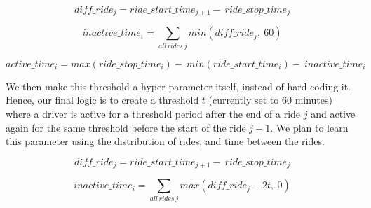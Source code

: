 \documentclass[11pt]{article}
\begin{document}




\begin{equation*}
    \mathit{diff}\_ride_j = ride\_start\_time_{j+1} -\ ride\_stop\_time_j
\end{equation*}

\begin{equation*}
    inactive\_time_i = \sum_{all\, rides\, j} min(\mathit{diff}\_ride_j,\ 60)
\end{equation*}

\begin{equation}
\label{No_Threshold}
    active\_time_i = max(ride\_stop\_time_i) -\ min(ride\_start\_time_i)  -\ inactive\_time_i
\end{equation}



We then make this threshold a hyper-parameter itself, instead of hard-coding it. Hence, our final logic is to create a threshold $t$ (currently set to $60$ minutes) where a driver is active for a threshold period after the end of a ride $j$ and active again for the same threshold before the start of the ride $j+1$. We plan to learn this parameter using the distribution of rides, and time between the rides.


\begin{equation*}
    \mathit{diff}\_ride_j = ride\_start\_time_{j+1} -\ ride\_stop\_time_j
\end{equation*}

\begin{equation*}
    inactive\_time_i = \sum_{all\, rides\, j} max(\mathit{diff}\_ride_j - 2t,\ 0) 
\end{equation*}
\end{document}
